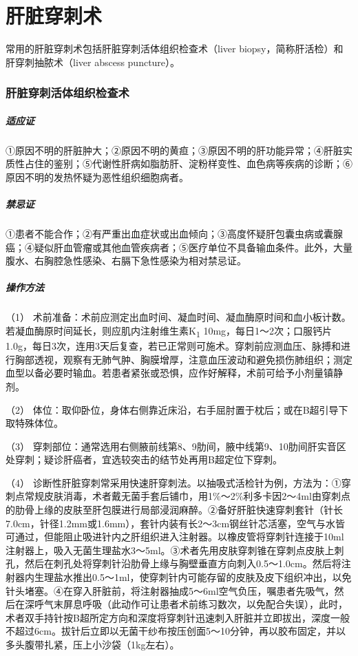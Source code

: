 \section{肝脏穿刺术}

常用的肝脏穿刺术包括肝脏穿刺活体组织检查术（liver
biopsy，简称肝活检）和肝穿刺抽脓术（liver abscess puncture）。

\subsubsection{肝脏穿刺活体组织检查术}

\subparagraph{适应证}

①原因不明的肝脏肿大；②原因不明的黄疸；③原因不明的肝功能异常；④肝脏实质性占住的鉴别；⑤代谢性肝病如脂肪肝、淀粉样变性、血色病等疾病的诊断；⑥原因不明的发热怀疑为恶性组织细胞病者。

\subparagraph{禁忌证}

①患者不能合作；②有严重出血症状或出血倾向；③高度怀疑肝包囊虫病或囊腺癌；④疑似肝血管瘤或其他血管疾病者；⑤医疗单位不具备输血条件。此外，大量腹水、右胸腔急性感染、右膈下急性感染为相对禁忌证。

\subparagraph{操作方法}

（1）
术前准备：术前应测定出血时间、凝血时间、凝血酶原时间和血小板计数。若凝血酶原时间延长，则应肌内注射维生素K\textsubscript{1}
10mg，每日1～2次；口服钙片1.0g，每日3次，连用3天后复查，若已正常则可施术。穿刺前应测血压、脉搏和进行胸部透视，观察有无肺气肿、胸膜增厚，注意血压波动和避免损伤肺组织；测定血型以备必要时输血。若患者紧张或恐惧，应作好解释，术前可给予小剂量镇静剂。

（2）
体位：取仰卧位，身体右侧靠近床沿，右手屈肘置于枕后；或在B超引导下取特殊体位。

（3）
穿刺部位：通常选用右侧腋前线第8、9肋间，腋中线第9、10肋间肝实音区处穿刺；疑诊肝癌者，宜选较突击的结节处再用B超定位下穿刺。

（4）
诊断性肝脏穿刺常采用快速肝穿刺法。以抽吸式活检针为例，方法为：①穿刺点常规皮肤消毒，术者戴无菌手套后铺巾，用1\%～2\%利多卡因2～4ml由穿刺点的肋骨上缘的皮肤至肝包膜进行局部浸润麻醉。②备好肝脏快速穿刺套针（针长7.0cm，针径1.2mm或1.6mm），套针内装有长2～3cm钢丝针芯活塞，空气与水皆可通过，但能阻止吸进针内之肝组织进入注射器。以橡皮管将穿刺针连接于10ml注射器上，吸入无菌生理盐水3～5ml。③术者先用皮肤穿刺锥在穿刺点皮肤上刺孔，然后在刺孔处将穿刺针沿肋骨上缘与胸壁垂直方向刺入0.5～1.0cm。然后将注射器内生理盐水推出0.5～1ml，使穿刺针内可能存留的皮肤及皮下组织冲出，以免针头堵塞。④在穿入肝脏前，将注射器抽成5～6ml空气负压，嘱患者先吸气，然后在深呼气末屏息呼吸（此动作可让患者术前练习数次，以免配合失误），此时，术者双手持针按B超所定方向和深度将穿刺针迅速刺入肝脏并立即拔出，深度一般不超过6cm。拔针后立即以无菌干纱布按压创面5～10分钟，再以胶布固定，并以多头腹带扎紧，压上小沙袋（1kg左右）。

